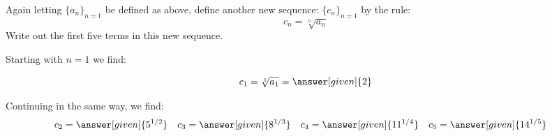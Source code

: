 \documentclass{ximera}
\begin{document}
\begin{example}
Again letting $\{a_n\}_{n=1}$ be defined as above, define another new
sequence: $\{c_n\}_{n=1}$ by the rule:
\[
c_n = \sqrt[n]{a_n} 
\]
Write out the first five terms in this new sequence.

\begin{explanation}
Starting with $n=1$ we find:

\[      c_1 = \sqrt[1]{a_1} = \answer[given]{2}       \]
      
Continuing in the same way, we find:     
     \begin{align*}
      	c_2 &=  \answer[given]{5^{1/2}}  & 
	c_3 &= \answer[given]{8^{1/3}}   & 
	c_4 &= \answer[given]{11^{1/4}}   & 
	c_5 &=  \answer[given]{14^{1/5}}   
    \end{align*}
    
\end{explanation}
\end{example}
\end{document}
